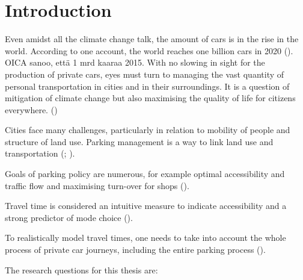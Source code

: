 \section{Introduction}
\justify


Even amidst all the climate change talk, the amount of cars is in the rise in the world. According to one account, the world reaches one billion cars in 2020 (\cite{Sperling2009}). OICA sanoo, että 1 mrd kaaraa 2015. With no slowing in sight for the production of private cars, eyes must turn to managing the vast quantity of personal transportation in cities and in their surroundings. It is a question of mitigation of climate change but also maximising the quality of life for citizens everywhere. (\cite{StatisticsFinland2019Energy2018})

Cities face many challenges, particularly in relation to mobility of people and structure of land use. Parking management is a way to link land use and transportation (\cite{Marsden2006TheReview}; \cite{Diallo2015MethodologyAnalysis}).

Goals of parking policy are numerous, for example optimal accessibility and traffic flow and maximising turn-over for shops (\cite{Marsden2006TheReview}). \par

Travel time is considered an intuitive measure to indicate accessibility and a strong predictor of mode choice (\cite{Frank2008UrbanChoice}).

To realistically model travel times, one needs to take into account the whole process of private car journeys, including the entire parking process (\cite{Salonen2013}).

\bigskip
\noindent
The research questions for this thesis are:


